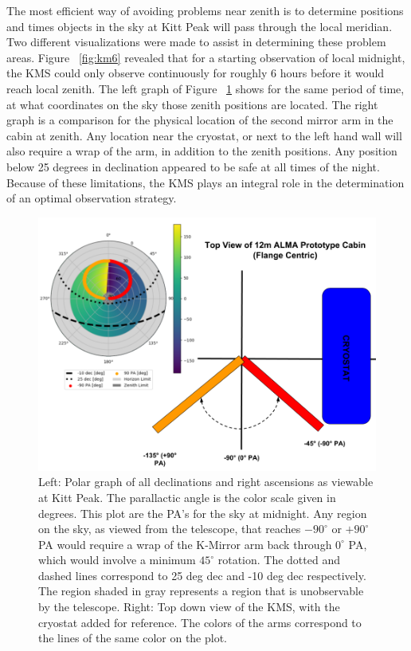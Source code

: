 \documentclass[manuscript]{aastex}
\begin{document}
The most efficient way of avoiding problems near zenith is to determine positions and times objects in the sky at Kitt Peak will pass through the local meridian. Two different visualizations were made to assist in determining these problem areas. Figure ~\ref{fig:km6} revealed that for a starting observation of local midnight, the KMS could only observe continuously for roughly 6 hours before it would reach local zenith. The left graph of Figure ~\ref{fig:km45} shows for the same period of time, at what coordinates on the sky those zenith positions are located. The right graph is a comparison for the physical location of the second mirror arm in the cabin at zenith. Any location near the cryostat, or next to the left hand wall will also require a wrap of the arm, in addition to the zenith positions. Any position below 25 degrees in declination appeared to be safe at all times of the night. Because of these limitations, the KMS plays an integral role in the determination of an optimal observation strategy.   

\begin{figure}[ht!]
	\centering
	\includegraphics[width=\textwidth]{km45.png}%
	\caption[Parallactic Angle Graphs to Determine Zenith Positions]{Left: Polar graph of all declinations and right ascensions as viewable at Kitt Peak. The parallactic angle is the color scale given in degrees. This plot are the PA's for the sky at midnight. Any region on the sky, as viewed from the telescope, that reaches $-90^{\circ}$ or $+90^{\circ}$ PA would require a wrap of the K-Mirror arm back through $0^{\circ}$ PA, which would involve a minimum $45^{\circ}$ rotation. The dotted and dashed lines correspond to 25 deg dec and -10 deg dec respectively. The region shaded in gray represents a region that is unobservable by the telescope. Right: Top down view of the KMS, with the cryostat added for reference. The colors of the arms correspond to the lines of the same color on the plot.}%
	\label{fig:km45}%
\end{figure}
\end{document}
